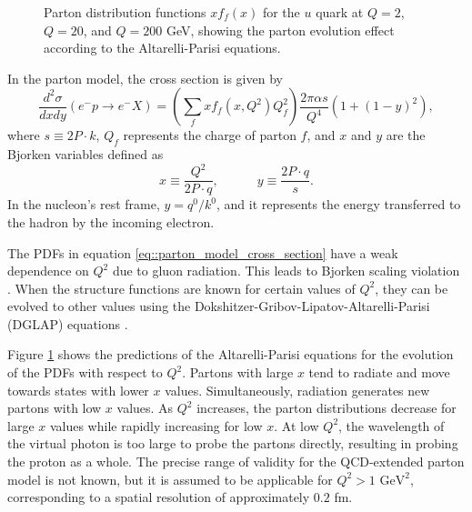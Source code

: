 \begin{figure}[b!]
    \centering
    \caption[$Q^2$ dependence of $x$ PDF for the $u$ quark.]{Parton distribution functions $xf_f(x)$ for the $u$ quark at $Q = 2$, $Q = 20$, and $Q = 200$ GeV, showing the parton evolution effect according to the Altarelli-Parisi equations.} %
    \label{fig::q2dependenceu}
\end{figure}

In the parton model, the cross section is given by
\begin{equation}
    \label{eq::parton_model_cross_section}
    \frac{d^2\sigma}{dxdy} \left( e^-p \rightarrow e^-X \right) =
            \left( \sum_f xf_f \left( x, Q^2 \right) Q_f^2 \right)
            \frac{2\pi\alpha s}{Q^4} \left( 1 + \left( 1 - y \right)^2 \right),
\end{equation}
where $s \equiv 2P\cdot k$, $Q_f$ represents the charge of parton $f$, and $x$ and $y$ are the Bjorken variables defined as
\begin{equation*}
    x \equiv \frac{Q^2}{2P\cdot q}, \hspace{36pt} y \equiv \frac{2 P\cdot q}{s}.
\end{equation*}
In the nucleon's rest frame, $y = q^0/k^0$, and it represents the energy transferred to the hadron by the incoming electron.

The PDFs in equation \eqref{eq::parton_model_cross_section} have a weak dependence on $Q^2$ due to gluon radiation.
This leads to Bjorken scaling violation \cite{halzen1991}.
When the structure functions are known for certain values of $Q^2$, they can be evolved to other values using the Dokshitzer-Gribov-Lipatov-Altarelli-Parisi (DGLAP) equations \cite{dokshitzer1991}.

Figure \ref{fig::q2dependenceu} shows the predictions of the Altarelli-Parisi equations for the evolution of the PDFs with respect to $Q^2$.
Partons with large $x$ tend to radiate and move towards states with lower $x$ values.
Simultaneously, radiation generates new partons with low $x$ values.
As $Q^2$ increases, the parton distributions decrease for large $x$ values while rapidly increasing for low $x$.
At low $Q^2$, the wavelength of the virtual photon is too large to probe the partons directly, resulting in probing the proton as a whole.
The precise range of validity for the QCD-extended parton model is not known, but it is assumed to be applicable for $Q^2 > 1 \text{ GeV}^2$, corresponding to a spatial resolution of approximately $0.2$ fm.
